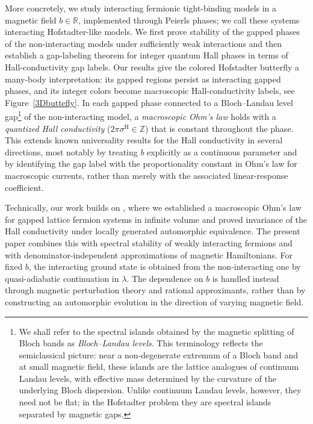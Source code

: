 \documentclass[a4paper]{article}
\newcommand{\Z}{\mathbb{Z}}
\newcommand{\R}{\mathbb{R}}
\theoremstyle{plain}
\theoremstyle{definition}
\theoremstyle{remark}
\renewcommand{\(}{\left(}
\renewcommand{\)}{\right)}
\begin{document}
More concretely, we study  interacting fermionic tight-binding models in a magnetic field $b\in\R$, implemented through Peierls phases; we call these systems interacting Hofstadter-like models. 
We first prove stability of the gapped phases of the non-interacting models under sufficiently weak interactions and then establish a gap-labeling theorem for integer quantum Hall phases in terms of Hall-conductivity gap labels. 
Our results give the colored Hofstadter butterfly a many-body interpretation: its gapped regions persist as interacting gapped phases, and its integer colors become macroscopic Hall-conductivity labels, see Figure~\ref{3Dbuttefly}.
In each gapped   phase connected to a Bloch--Landau level gap\footnote{We shall refer to the spectral islands obtained by the magnetic splitting of Bloch bands as
\emph{Bloch--Landau levels}. This terminology reflects the semiclassical picture: near a
non-degenerate extremum of a Bloch band and at small magnetic field, these islands are the
lattice analogues of continuum Landau levels, with effective mass determined by the curvature
of the underlying Bloch dispersion. Unlike continuum Landau levels, however, they need not be
flat; in the Hofstadter problem they are spectral islands separated by magnetic gaps.} of the non-interacting model, a \emph{macroscopic Ohm's law} holds with a \emph{quantized Hall conductivity} ($2\pi\sigma^{\mathrm H}\in\Z$) that is constant throughout the phase.  This extends known universality results for the Hall conductivity in several directions, most notably by treating $b$ explicitly as a continuous parameter and by identifying the gap label with the proportionality constant in Ohm's law for macroscopic currents, rather than merely with the associated linear-response coefficient. 




Technically, our work builds on \cite{WMMMT24}, where we established a macroscopic Ohm's law for gapped lattice fermion systems in infinite volume and proved invariance of the Hall conductivity under locally generated automorphic equivalence. The present paper combines this with spectral stability of weakly interacting fermions \cite{de2019persistence,hastings2019stability,GMP2017} and with denominator-independent approximations of magnetic Hamiltonians. For fixed $b$, the interacting ground state is obtained from the non-interacting one by quasi-adiabatic continuation in $\lambda$. The dependence on $b$ is handled instead through magnetic perturbation theory and  rational approximants,   rather than by constructing an automorphic evolution in the direction of varying magnetic field.
\end{document}
